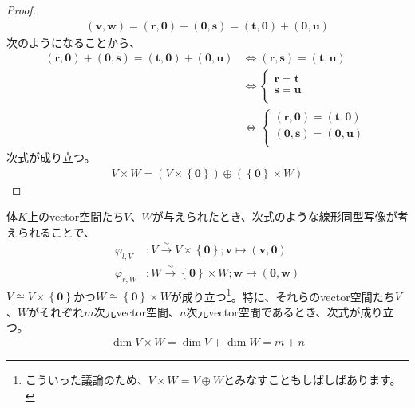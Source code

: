 \documentclass[dvipdfmx]{jsarticle}
\begin{document}
\begin{proof}
\begin{align*}
\left( \mathbf{v},\mathbf{w} \right) = \left( \mathbf{r},\mathbf{0} \right) + \left( \mathbf{0},\mathbf{s} \right) = \left( \mathbf{t},\mathbf{0} \right) + \left( \mathbf{0},\mathbf{u} \right)
\end{align*}
次のようになることから、
\begin{align*}
\left( \mathbf{r},\mathbf{0} \right) + \left( \mathbf{0},\mathbf{s} \right) = \left( \mathbf{t},\mathbf{0} \right) + \left( \mathbf{0},\mathbf{u} \right) &\Leftrightarrow \left( \mathbf{r},\mathbf{s} \right) = \left( \mathbf{t},\mathbf{u} \right)\\
&\Leftrightarrow \left\{ \begin{matrix}
\mathbf{r} = \mathbf{t} \\
\mathbf{s} = \mathbf{u} \\
\end{matrix} \right.\ \\
&\Leftrightarrow \left\{ \begin{matrix}
\left( \mathbf{r},\mathbf{0} \right) = \left( \mathbf{t},\mathbf{0} \right) \\
\left( \mathbf{0},\mathbf{s} \right) = \left( \mathbf{0},\mathbf{u} \right) \\
\end{matrix} \right.\ 
\end{align*}
次式が成り立つ。
\begin{align*}
V \times W = \left( V \times \left\{ \mathbf{0} \right\} \right) \oplus \left( \left\{ \mathbf{0} \right\} \times W \right)
\end{align*}
\end{proof}
\begin{thm}\label{2.4.9.3}
体$K$上のvector空間たち$V$、$W$が与えられたとき、次式のような線形同型写像が考えられることで、
\begin{align*}
\varphi_{l,V}&:V\overset{\sim}{\rightarrow}V \times \left\{ \mathbf{0} \right\};\mathbf{v} \mapsto \left( \mathbf{v},\mathbf{0} \right)\\
\varphi_{r,W}&:W\overset{\sim}{\rightarrow}\left\{ \mathbf{0} \right\} \times W;\mathbf{w} \mapsto \left( \mathbf{0},\mathbf{w} \right)
\end{align*}
$V \cong V \times \left\{ \mathbf{0} \right\}$かつ$W \cong \left\{ \mathbf{0} \right\} \times W$が成り立つ\footnote{こういった議論のため、$V \times W = V \oplus W$とみなすこともしばしばあります。}。特に、それらのvector空間たち$V$、$W$がそれぞれ$m$次元vector空間、$n$次元vector空間であるとき、次式が成り立つ。
\begin{align*}
\dim{V \times W} = \dim V + \dim W = m + n
\end{align*}
\end{thm}
\end{document}
